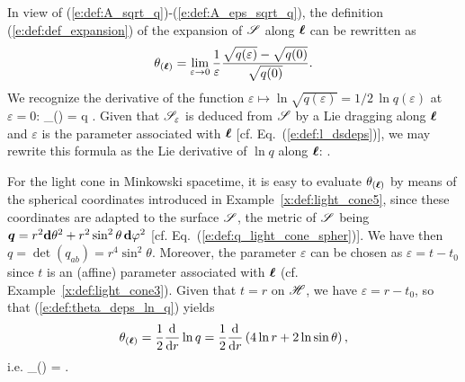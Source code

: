 In view of (\ref{e:def:A_sqrt_q})-(\ref{e:def:A_eps_sqrt_q}), the definition (\ref{e:def:def_expansion})
of the expansion of $\mathscr{S}$ along $\bm{\ell}$ can be rewritten as
\[
    \theta_{(\bm{\ell})} = \lim_{\varepsilon\rightarrow 0} \frac{1}{\varepsilon}
    \frac{\sqrt{q(\varepsilon)} - \sqrt{q(0)}}{\sqrt{q(0)}} .
\]
We recognize the derivative of the function $\varepsilon \mapsto \ln \sqrt{q(\varepsilon)}=
1/2\, \ln q(\varepsilon)$ at $\varepsilon=0$:
\be \label{e:def:theta_deps_ln_q}
     \theta_{(\wl)} =  \frac{\D}{\D\varepsilon}  \ln q .
\ee
Given that $\mathscr{S}_\varepsilon$ is deduced from $\mathscr{S}$ by a Lie dragging along $\bm{\ell}$
and $\varepsilon$ is the parameter associated with $\bm{\ell}$ [cf. Eq.~(\ref{e:def:l_dsdeps})], we may
rewrite this formula as the Lie derivative of $\ln q$ along $\bm{\ell}$:
\be \label{e:def:theta_Lie_ln_q}
    .
\ee
\begin{example} \label{x:def:light_cone6}
For the light cone in Minkowski spacetime,
it is easy to evaluate $\theta_{(\bm{\ell})}$ by means of the spherical coordinates
introduced in Example~\ref{x:def:light_cone5}, since these coordinates are adapted to the
surface $\mathscr{S}$, the metric of $\mathscr{S}$ being $\bm{q} = r^2 \mathbf{d} \theta^2
+ r^2\sin^2\theta\, \mathbf{d} \varphi^2$ [cf. Eq.~(\ref{e:def:q_light_cone_spher})].
We have then  $q = \det(q_{ab}) = r^4\sin^2\theta$. Moreover, the parameter $\varepsilon$
can be chosen as $\varepsilon = t - t_0$ since $t$ is an (affine) parameter
associated with $\bm{\ell}$ (cf. Example~\ref{x:def:light_cone3}). Given that
$t=r$ on $\mathscr{H}$, we have $\varepsilon = r - t_0$, so that (\ref{e:def:theta_deps_ln_q})
yields
\[
    \theta_{(\bm{\ell})} = \frac{1}{2} \frac{\mathrm{d}}{\mathrm{d} r}  \ln q =
         \frac{1}{2} \frac{\mathrm{d}}{\mathrm{d} r} \left( 4 \ln r + 2 \ln\sin\theta \right) ,
\]
i.e.
\be \label{e:def:theta_light_cone}
    \theta_{(\wl)} =  .
\ee
\end{example}

